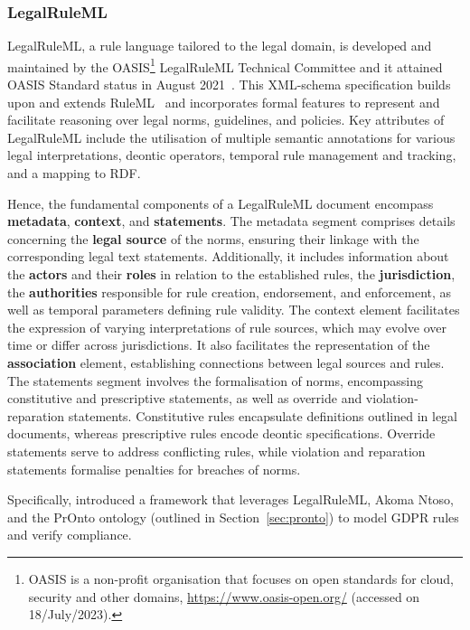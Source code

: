 \subsubsection{LegalRuleML}
\label{sec:legalruleml}

LegalRuleML, a rule language tailored to the legal domain, is developed and maintained by the OASIS\footnote{OASIS is a non-profit organisation that focuses on open standards for cloud, security and other domains, \url{https://www.oasis-open.org/} (accessed on 18/July/2023).} LegalRuleML Technical Committee and it attained OASIS Standard status in August 2021~\citep{palmirani_legalruleml_2021}.
This XML-schema specification builds upon and extends RuleML~\citep{boley_specification_2017} and incorporates formal features to represent and facilitate reasoning over legal norms, guidelines, and policies.
Key attributes of LegalRuleML include the utilisation of multiple semantic annotations for various legal interpretations, deontic operators, temporal rule management and tracking, and a mapping to RDF.

Hence, the fundamental components of a LegalRuleML document encompass \textbf{metadata}, \textbf{context}, and \textbf{statements}. 
The metadata segment comprises details concerning the \textbf{legal source} of the norms, ensuring their linkage with the corresponding legal text statements.
Additionally, it includes information about the \textbf{actors} and their \textbf{roles} in relation to the established rules, the \textbf{jurisdiction}, the \textbf{authorities} responsible for rule creation, endorsement, and enforcement, as well as temporal parameters defining rule validity.
The context element facilitates the expression of varying interpretations of rule sources, which may evolve over time or differ across jurisdictions.
It also facilitates the representation of the \textbf{association} element, establishing connections between legal sources and rules.
The statements segment involves the formalisation of norms, encompassing constitutive and prescriptive statements, as well as override and violation-reparation statements.
Constitutive rules encapsulate definitions outlined in legal documents, whereas prescriptive rules encode deontic specifications.
Override statements serve to address conflicting rules, while violation and reparation statements formalise penalties for breaches of norms.

Specifically, \cite{palmirani_modelling_2018} introduced a framework that leverages LegalRuleML, Akoma Ntoso, and the PrOnto ontology (outlined in Section~\ref{sec:pronto}) to model GDPR rules and verify compliance.

